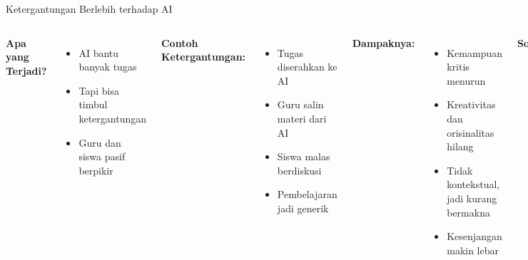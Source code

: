 \documentclass[aspectratio=169, table]{beamer}
\begin{document}
	\begin{frame}[fragile]{Ketergantungan Berlebih terhadap AI}
		\vspace{15pt}
		\begin{columns}[T]
			\textbf{Apa yang Terjadi?}
			\begin{itemize}
				\item AI bantu banyak tugas
				\item Tapi bisa timbul ketergantungan
				\item Guru dan siswa pasif berpikir
			\end{itemize}
			
			\textbf{Contoh Ketergantungan:}
			\begin{itemize}
				\item Tugas diserahkan ke AI
				\item Guru salin materi dari AI
				\item Siswa malas berdiskusi
				\item Pembelajaran jadi generik
			\end{itemize}
			
			\textbf{Dampaknya:}
			\begin{itemize}
				\item Kemampuan kritis menurun
				\item Kreativitas dan orisinalitas hilang
				\item Tidak kontekstual, jadi kurang bermakna
				\item Kesenjangan makin lebar
			\end{itemize}
			
			\textbf{Solusi:}
			\begin{itemize}
				\item AI sebagai alat bantu
				\item Ajak refleksi atas jawabannya
				\item Dorong ekspresi dan gagasan asli
				\item Latih metakognisi dalam penggunaan
			\end{itemize}
		\end{columns}
	\end{frame}
	
\end{document}

